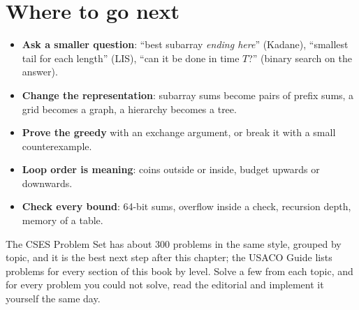 \section[Where to go next]{Where to go next \hfill \bronze}

\begin{summary}
\begin{itemize}
  \item \textbf{Ask a smaller question}: ``best subarray \emph{ending here}'' (Kadane), ``smallest tail for each length''
        (LIS), ``can it be done in time $T$?'' (binary search on the answer).
  \item \textbf{Change the representation}: subarray sums become pairs of prefix sums, a grid becomes a graph, a hierarchy
        becomes a tree.
  \item \textbf{Prove the greedy} with an exchange argument, or break it with a small counterexample.
  \item \textbf{Loop order is meaning}: coins outside or inside, budget upwards or downwards.
  \item \textbf{Check every bound}: 64-bit sums, overflow inside a check, recursion depth, memory of a table.
\end{itemize}
\end{summary}

The CSES Problem Set has about 300 problems in the same style, grouped by topic, and it is the best next step after this
chapter; the USACO Guide lists problems for every section of this book by level. Solve a few from each topic, and for every
problem you could not solve, read the editorial and implement it yourself the same day.
